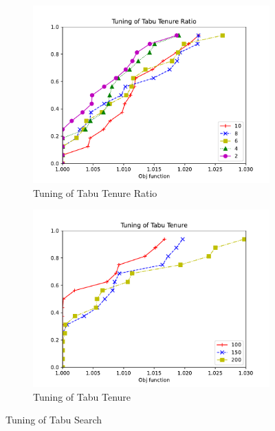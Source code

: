 \begin{figure}[!h]
    \centering
        \begin{subfigure}{0.48\textwidth} %
            \includegraphics[scale=0.45]{images/tabu.pdf} 
            \caption{Tuning of Tabu Tenure Ratio}
            \label{fig:tabu}
        \end{subfigure}
        \begin{subfigure}{0.48\textwidth}
            \includegraphics[scale=0.45]{images/tabu2.pdf}
            \caption{Tuning of Tabu Tenure}
            \label{fig:tabu2}
        \end{subfigure}
    \caption{Tuning of Tabu Search}
    \end{figure}